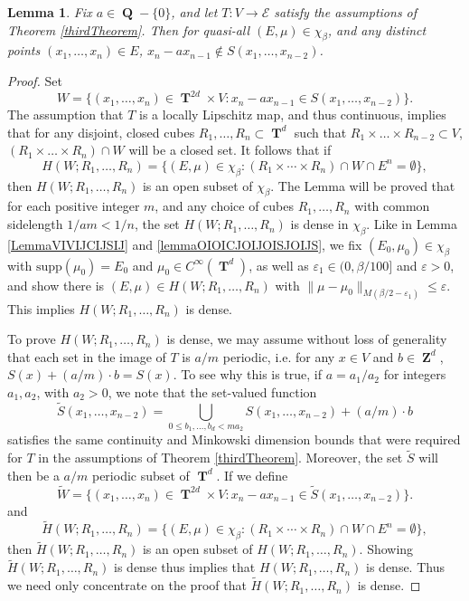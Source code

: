 \documentclass[dvipsnames,letterpaper,12pt]{article}
\numberwithin{equation}{section}
\DeclareMathOperator{\ZZ}{\mathbf{Z}}
\DeclareMathOperator{\QQ}{\mathbf{Q}}
\DeclareMathOperator{\TT}{\mathbf{T}}
\newtheorem{lemma}[theorem]{Lemma}
\numberwithin{theorem}{section}
\begin{document}
\begin{lemma}
    Fix $a \in \QQ - \{ 0 \}$, and let $T: V \to \mathcal{E}$ satisfy the assumptions of Theorem \ref{thirdTheorem}. Then for quasi-all $(E,\mu) \in \chi_\beta$, and any distinct points $(x_1,\dots,x_n) \in E$, $x_n - ax_{n-1} \not \in S(x_1,\dots,x_{n-2})$.   
\end{lemma}
\begin{proof}
    Set
    \[ W = \{ (x_1,\dots,x_n) \in \TT^{2d} \times V : x_n - ax_{n-1} \in S(x_1,\dots,x_{n-2}) \}. \]
    The assumption that $T$ is a locally Lipschitz map, and thus continuous, implies that for any disjoint, closed cubes $R_1,\dots,R_n \subset \TT^d$ such that $R_1 \times \dots \times R_{n-2} \subset V$, $(R_1 \times \dots \times R_n) \cap W$ will be a closed set. It follows that if
    \[ H(W;R_1,\dots,R_n) = \{ (E,\mu) \in \chi_\beta: (R_1 \times \cdots \times R_n) \cap W \cap E^n = \emptyset \}, \]
    then $H(W;R_1,\dots,R_n)$ is an open subset of $\chi_\beta$. The Lemma will be proved that for each positive integer $m$, and any choice of cubes $R_1,\dots,R_n$ with common sidelength $1/am < 1/n$, the set $H(W;R_1,\dots,R_n)$ is dense in $\chi_\beta$. Like in Lemma \ref{LemmaVIVIJCIJSIJ} and \ref{lemmaOIOICJOIJOISJOIJS}, we fix $(E_0,\mu_0) \in \chi_\beta$ with $\text{supp}(\mu_0) = E_0$ and $\mu_0 \in C^\infty(\TT^d)$, as well as $\varepsilon_1 \in (0,\beta/100]$ and $\varepsilon > 0$, and show there is $(E,\mu) \in H(W;R_1,\dots,R_n)$ with $\| \mu - \mu_0 \|_{M(\beta/2 - \varepsilon_1)} \leq \varepsilon$. This implies $H(W;R_1,\dots,R_n)$ is dense.

    To prove $H(W;R_1,\dots,R_n)$ is dense, we may assume without loss of generality that each set in the image of $T$ is $a/m$ periodic, i.e. for any $x \in V$ and $b \in \ZZ^d$, $S(x) + (a/m) \cdot b = S(x)$. To see why this is true, if $a = a_1/a_2$ for integers $a_1,a_2$, with $a_2 > 0$, we note that the set-valued function
    \[ \tilde{S}(x_1,\dots,x_{n-2}) = \bigcup_{0 \leq b_1,\dots,b_d < m a_2} S(x_1,\dots,x_{n-2}) + (a/m) \cdot b \]
    satisfies the same continuity and Minkowski dimension bounds that were required for $T$ in the assumptions of Theorem \ref{thirdTheorem}. Moreover, the set $\tilde{S}$ will then be a $a/m$ periodic subset of $\TT^d$. If we define
    \[ \tilde{W} = \{ (x_1,\dots,x_n) \in \TT^{2d} \times V : x_n - ax_{n-1} \in \tilde{S}(x_1,\dots,x_{n-2}) \}. \]
    and
    \[ \tilde{H}(W;R_1,\dots,R_n) = \{ (E,\mu) \in \chi_\beta: (R_1 \times \cdots \times R_n) \cap W \cap E^n = \emptyset \}, \]
    then $\tilde{H}(W;R_1,\dots,R_n)$ is an open subset of $H(W;R_1,\dots,R_n)$. Showing $\tilde{H}(W;R_1,\dots,R_n)$ is dense thus implies that $H(W;R_1,\dots,R_n)$ is dense. Thus we need only concentrate on the proof that $\tilde{H}(W;R_1,\dots,R_n)$ is dense.


\end{proof}
\end{document}
